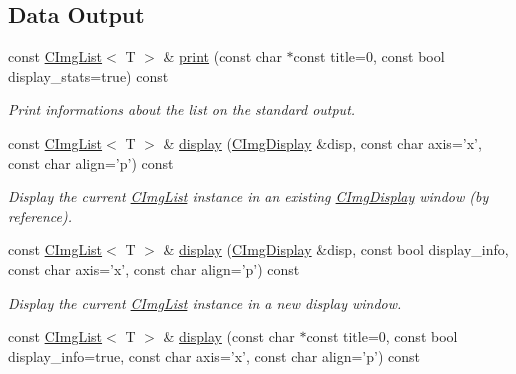 \subsection*{Data Output}
\label{_amgrp94c0e9b311d45b04fc37b41903c6debc}
 \begin{DoxyCompactItemize}
\item 
\hypertarget{structcimg__library_1_1CImgList_a6c6d78b8f8373762be3bb82ce01c7b97}{
const \hyperlink{structcimg__library_1_1CImgList}{CImgList}$<$ T $>$ \& \hyperlink{structcimg__library_1_1CImgList_a6c6d78b8f8373762be3bb82ce01c7b97}{print} (const char $\ast$const title=0, const bool display\_\-stats=true) const }
\label{structcimg__library_1_1CImgList_a6c6d78b8f8373762be3bb82ce01c7b97}

\begin{DoxyCompactList}\small\item\em Print informations about the list on the standard output. \item\end{DoxyCompactList}\item 
const \hyperlink{structcimg__library_1_1CImgList}{CImgList}$<$ T $>$ \& \hyperlink{structcimg__library_1_1CImgList_abfa17448c3a4985faba1e30c32a04005}{display} (\hyperlink{structcimg__library_1_1CImgDisplay}{CImgDisplay} \&disp, const char axis='x', const char align='p') const 
\begin{DoxyCompactList}\small\item\em Display the current \hyperlink{structcimg__library_1_1CImgList}{CImgList} instance in an existing \hyperlink{structcimg__library_1_1CImgDisplay}{CImgDisplay} window (by reference). \item\end{DoxyCompactList}\item 
const \hyperlink{structcimg__library_1_1CImgList}{CImgList}$<$ T $>$ \& \hyperlink{structcimg__library_1_1CImgList_ac670d063ffced544589167ae7541e3f3}{display} (\hyperlink{structcimg__library_1_1CImgDisplay}{CImgDisplay} \&disp, const bool display\_\-info, const char axis='x', const char align='p') const 
\begin{DoxyCompactList}\small\item\em Display the current \hyperlink{structcimg__library_1_1CImgList}{CImgList} instance in a new display window. \item\end{DoxyCompactList}\item 
\hypertarget{structcimg__library_1_1CImgList_add4fdf317970262811a68d52dc46f91b}{
const \hyperlink{structcimg__library_1_1CImgList}{CImgList}$<$ T $>$ \& \hyperlink{structcimg__library_1_1CImgList_add4fdf317970262811a68d52dc46f91b}{display} (const char $\ast$const title=0, const bool display\_\-info=true, const char axis='x', const char align='p') const }
\label{structcimg__library_1_1CImgList_add4fdf317970262811a68d52dc46f91b}


\end{DoxyCompactItemize}
